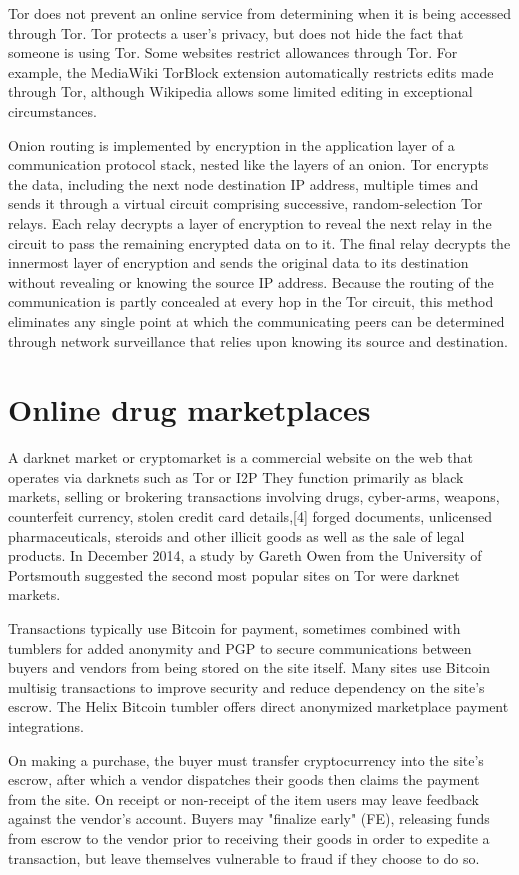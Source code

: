 \documentclass[
  digital, %
  table,   %
  lof,     %
  lot,     %
  oneside
]{fithesis3}
\begin{document}
Tor does not prevent an online service from determining when it is being accessed through Tor. Tor protects a user's privacy,
but does not hide the fact that someone is using Tor. Some websites restrict allowances through Tor. For example, the MediaWiki TorBlock extension automatically restricts edits made through Tor,
although Wikipedia allows some limited editing in exceptional circumstances.

Onion routing is implemented by encryption in the application layer of a communication protocol stack, nested like the layers of an onion. 
Tor encrypts the data, including the next node destination IP address, multiple times and sends it through a virtual circuit comprising successive, random-selection Tor relays.
Each relay decrypts a layer of encryption to reveal the next relay in the circuit to pass the remaining encrypted data on to it. The final relay decrypts the innermost layer of encryption and sends
the original data to its destination without revealing or knowing the source IP address. Because the routing of the communication is partly concealed at every hop in the Tor circuit,
this method eliminates any single point at which the communicating peers can be determined through network surveillance that relies upon knowing its source and destination.

\section{Online drug marketplaces}
A darknet market or cryptomarket is a commercial website on the web that operates via darknets such as Tor or I2P
They function primarily as black markets, selling or brokering transactions involving drugs, cyber-arms, weapons,
counterfeit currency, stolen credit card details,[4] forged documents, unlicensed pharmaceuticals, steroids and
other illicit goods as well as the sale of legal products. In December 2014, a study by Gareth Owen from the University
of Portsmouth suggested the second most popular sites on Tor were darknet markets.

Transactions typically use Bitcoin for payment, sometimes combined with tumblers for added anonymity and PGP to secure communications
between buyers and vendors from being stored on the site itself. Many sites use Bitcoin multisig transactions 
to improve security and reduce dependency on the site's escrow. The Helix Bitcoin tumbler offers direct anonymized marketplace payment integrations.

On making a purchase, the buyer must transfer cryptocurrency into the site's escrow, after which a vendor dispatches their goods then claims the
payment from the site. On receipt or non-receipt of the item users may leave feedback against the vendor's account. Buyers may "finalize early"
(FE), releasing funds from escrow to the vendor prior to receiving their goods in order to expedite a transaction, but leave themselves vulnerable to fraud if they choose to do so.
\end{document}
